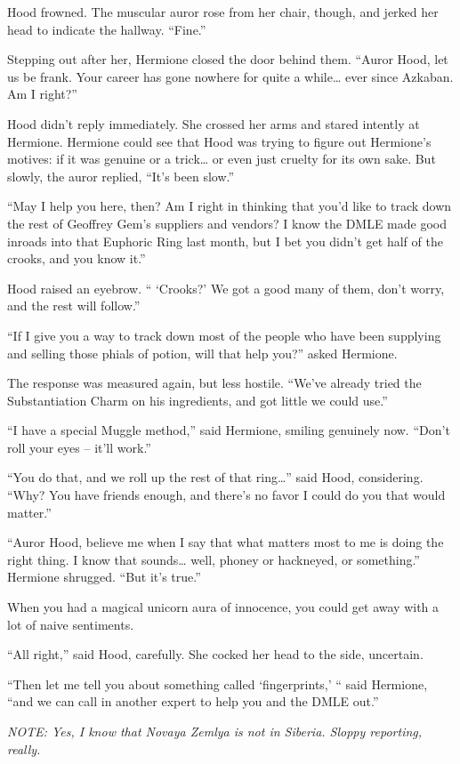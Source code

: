 Hood frowned. The muscular auror rose from her chair, though, and jerked
her head to indicate the hallway. ``Fine.''

Stepping out after her, Hermione closed the door behind them. ``Auror
Hood, let us be frank. Your career has gone nowhere for quite a
while\ldots{} ever since Azkaban. Am I right?''

Hood didn't reply immediately. She crossed her arms and stared intently
at Hermione. Hermione could see that Hood was trying to figure out
Hermione's motives: if it was genuine or a trick\ldots{} or even just
cruelty for its own sake. But slowly, the auror replied, ``It's been
slow.''

``May I help you here, then? Am I right in thinking that you'd like to
track down the rest of Geoffrey Gem's suppliers and vendors? I know the
DMLE made good inroads into that Euphoric Ring last month, but I bet you
didn't get half of the crooks, and you know it.''

Hood raised an eyebrow. `` `Crooks?' We got a good many of them, don't
worry, and the rest will follow.''

``If I give you a way to track down most of the people who have been
supplying and selling those phials of potion, will that help you?''
asked Hermione.

The response was measured again, but less hostile. ``We've already tried
the Substantiation Charm on his ingredients, and got little we could
use.''

``I have a special Muggle method,'' said Hermione, smiling genuinely
now. ``Don't roll your eyes -- it'll work.''

``You do that, and we roll up the rest of that ring\ldots{}'' said Hood,
considering. ``Why? You have friends enough, and there's no favor I
could do you that would matter.''

``Auror Hood, believe me when I say that what matters most to me is
doing the right thing. I know that sounds\ldots{} well, phoney or
hackneyed, or something.'' Hermione shrugged. ``But it's true.''

When you had a magical unicorn aura of innocence, you could get away
with a lot of naive sentiments.

``All right,'' said Hood, carefully. She cocked her head to the side,
uncertain.

``Then let me tell you about something called `fingerprints,' `` said
Hermione, ``and we can call in another expert to help you and the DMLE
out.''

\mybreak

\emph{NOTE: Yes, I know that Novaya Zemlya is not in Siberia. Sloppy
reporting, really.}
